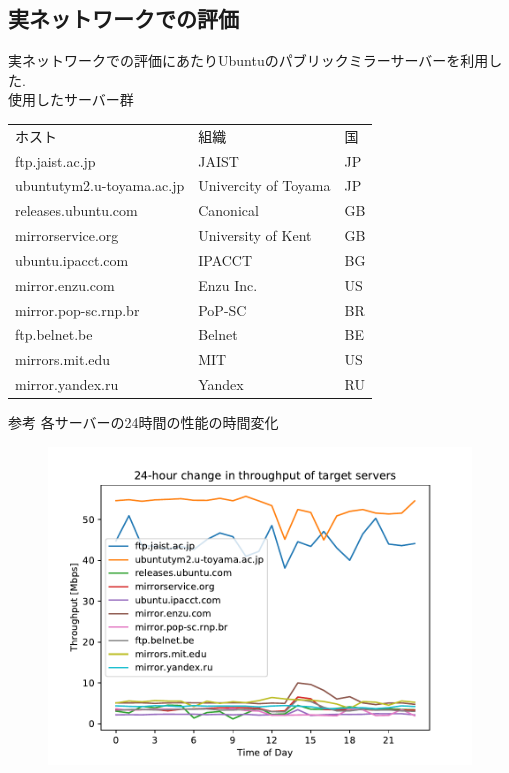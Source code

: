 \documentclass[a4j,12pt]{gradthesis_utf8}
\begin{document}
\subsection{実ネットワークでの評価}
実ネットワークでの評価にあたりUbuntuのパブリックミラーサーバーを利用した.\\
使用したサーバー群
\begin{table}[htb]
	\begin{tabular}{lll}
		ホスト & 組織 & 国\\
		ftp.jaist.ac.jp & JAIST & JP \\
		ubuntutym2.u-toyama.ac.jp & Univercity of Toyama & JP \\
		releases.ubuntu.com & Canonical & GB \\
		mirrorservice.org & University of Kent & GB \\
		ubuntu.ipacct.com & IPACCT & BG \\
		mirror.enzu.com & Enzu Inc. & US \\
		mirror.pop-sc.rnp.br & PoP-SC & BR \\
		ftp.belnet.be & Belnet & BE \\
		mirrors.mit.edu & MIT & US \\
		mirror.yandex.ru & Yandex & RU \\
	\end{tabular}
\end{table}

参考 各サーバーの24時間の性能の時間変化
\begin{figure}
	\begin{center}
		\includegraphics[width=15cm]{thp24h.pdf}
	\end{center}
\end{figure}
\end{document}

